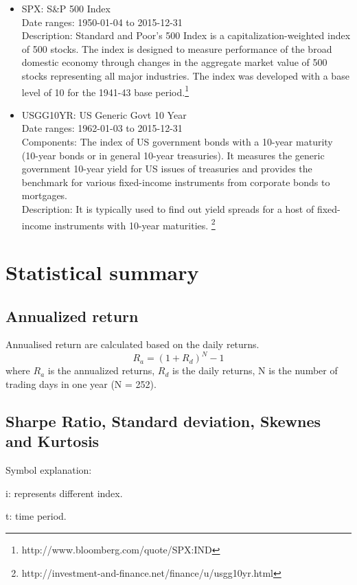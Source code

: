 \documentclass[12pt]{article}
\begin{document}
\begin{itemize}
\item SPX: S\&P 500 Index\\
Date ranges: 1950-01-04 to 2015-12-31 \\
Description: Standard and Poor's 500 Index is a capitalization-weighted index of 500 stocks. The index is designed to measure performance of the broad domestic economy through changes in the aggregate market value of 500 stocks representing all major industries. The index was developed with a base level of 10 for the 1941-43 base period.\footnote{http://www.bloomberg.com/quote/SPX:IND}
\item USGG10YR: US Generic Govt 10 Year\\
Date ranges: 1962-01-03 to 2015-12-31 \\
Components:  The index of US government bonds with a 10-year maturity (10-year bonds or in general 10-year treasuries). It measures the generic government 10-year yield for US issues of treasuries and provides the benchmark for various fixed-income instruments from corporate bonds to mortgages. \\
Description: It is typically used to find out yield spreads for a host of fixed-income instruments with 10-year maturities. \footnote{http://investment-and-finance.net/finance/u/usgg10yr.html}
\end{itemize}


\section{Statistical summary}

\subsection{Annualized return}

Annualised return are calculated based on the daily returns. 
\begin{equation}
R_a = (1+R_d)^{N} -1
\end{equation}
where $R_a$ is the annualized returns, $R_d$ is the daily returns, N is the number of trading days in one year (N = 252).

\subsection{Sharpe Ratio, Standard deviation, Skewnes and Kurtosis}
Symbol explanation:

i: represents different index.

t: time period.
\end{document}
